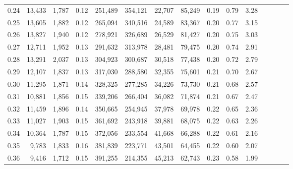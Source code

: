 \begin{tabular}{rrrcrrrrrrrrrrr}
0.24 &  13,433 &  1,787 &                                       0.12 &  251,489 &  354,121 &   22,707 &   85,249 &  0.19 &  0.79 &                         3.28 \\
0.25 &  13,605 &  1,882 &                                       0.12 &  265,094 &  340,516 &   24,589 &   83,367 &  0.20 &  0.77 &                         3.15 \\
0.26 &  13,827 &  1,940 &                                       0.12 &  278,921 &  326,689 &   26,529 &   81,427 &  0.20 &  0.75 &                         3.03 \\
0.27 &  12,711 &  1,952 &                                       0.13 &  291,632 &  313,978 &   28,481 &   79,475 &  0.20 &  0.74 &                         2.91 \\
0.28 &  13,291 &  2,037 &                                       0.13 &  304,923 &  300,687 &   30,518 &   77,438 &  0.20 &  0.72 &                         2.79 \\
0.29 &  12,107 &  1,837 &                                       0.13 &  317,030 &  288,580 &   32,355 &   75,601 &  0.21 &  0.70 &                         2.67 \\
0.30 &  11,295 &  1,871 &                                       0.14 &  328,325 &  277,285 &   34,226 &   73,730 &  0.21 &  0.68 &                         2.57 \\
0.31 &  10,881 &  1,856 &                                       0.15 &  339,206 &  266,404 &   36,082 &   71,874 &  0.21 &  0.67 &                         2.47 \\
0.32 &  11,459 &  1,896 &                                       0.14 &  350,665 &  254,945 &   37,978 &   69,978 &  0.22 &  0.65 &                         2.36 \\
0.33 &  11,027 &  1,903 &                                       0.15 &  361,692 &  243,918 &   39,881 &   68,075 &  0.22 &  0.63 &                         2.26 \\
0.34 &  10,364 &  1,787 &                                       0.15 &  372,056 &  233,554 &   41,668 &   66,288 &  0.22 &  0.61 &                         2.16 \\
0.35 &   9,783 &  1,833 &                                       0.16 &  381,839 &  223,771 &   43,501 &   64,455 &  0.22 &  0.60 &                         2.07 \\
0.36 &   9,416 &  1,712 &                                       0.15 &  391,255 &  214,355 &   45,213 &   62,743 &  0.23 &  0.58 &                         1.99 \\

\end{tabular}

